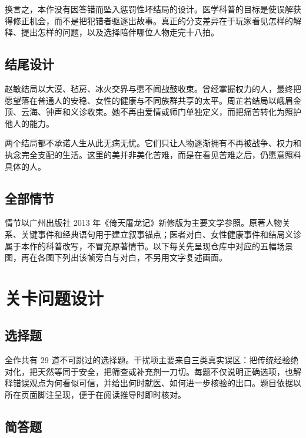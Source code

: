 \documentclass[lang=cn,a4paper,11pt,citestyle=gb7714-2015,bibstyle=gb7714-2015]{elegantpaper}
\begin{document}
换言之，本作没有因答错而坠入惩罚性坏结局的设计。医学科普的目标是使误解获得修正机会，而不是把犯错者驱逐出故事。真正的分支差异在于玩家看见怎样的解释、提出怎样的问题，以及选择陪伴哪位人物走完十八拍。

\subsection{结尾设计}

赵敏结局以大漠、毡房、冰火交界与愿不闻战鼓收束。曾经掌握权力的人，最终把愿望落在普通人的安稳、女性的健康与不同族群共享的太平。周芷若结局以峨眉金顶、云海、钟声和义诊收束。她不再由爱情或师门单独定义，而把痛苦转化为照护他人的能力。

两个结局都不承诺人生从此无病无忧。它们只让人物逐渐拥有不再被战争、权力和执念完全支配的生活。这里的美并非美化苦难，而是在看见苦难之后，仍愿意照料具体的人。

\subsection{全部情节}

情节以广州出版社 2013 年《倚天屠龙记》新修版为主要文学参照\cite{jinyong2013}。原著人物关系、关键事件和经典语句用于建立叙事锚点；医者对白、女性健康事件和结局义诊属于本作的科普改写，不冒充原著情节。以下每关先呈现仓库中对应的五幅场景图，再在各图下列出该帧旁白与对白，不另用文字复述画面。



\clearpage
\section{关卡问题设计}\label{sec:questions}

\subsection{选择题}

全作共有 29 道不可跳过的选择题。干扰项主要来自三类真实误区：把传统经验绝对化，把天然等同于安全，把筛查或补充剂一刀切。每题不仅说明正确选项，也解释错误观点为何看似可信，并给出何时就医、如何进一步核验的出口。题目依据以所在页面脚注呈现，便于在阅读推导时即时核对。



\subsection{简答题}
\end{document}
